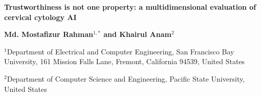\documentclass[12pt,letterpaper]{article}
\begin{document}
\linenumbers

\begin{center}
{\fontsize{16}{19}\selectfont\bfseries Trustworthiness is not one property: a multidimensional evaluation of cervical cytology AI\par}
\vspace{18pt}
{\fontsize{12}{14}\selectfont\bfseries Md. Mostafizur Rahman$^{1,*}$ and Khairul Anam$^{2}$\par}
\vspace{4pt}
{\fontsize{10}{12}\selectfont $^1$Department of Electrical and Computer Engineering, San Francisco Bay University, 161 Mission Falls Lane, Fremont, California 94539, United States\par}
{\fontsize{10}{12}\selectfont $^2$Department of Computer Science and Engineering, Pacific State University, United States\par}
\end{center}
\end{document}
